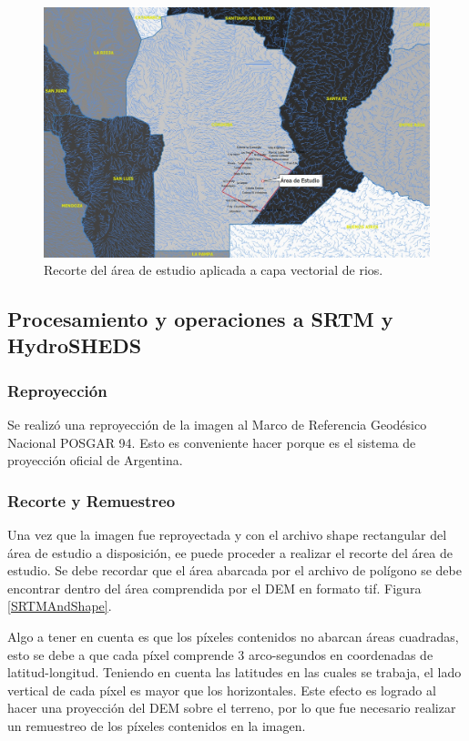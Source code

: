 \documentclass[10pt,a4paper, twoside]{report}
\begin{document}
\begin{figure}[!htb]
   \centering      
   \includegraphics[width=1.0\textwidth]{imagenes/areaestudiorios.jpg}
 \caption{Recorte del área de estudio aplicada a capa vectorial de rios.}
 \label{areaestudiorios}
\end{figure}

\subsection{Procesamiento y operaciones a SRTM y HydroSHEDS}


\subsubsection{Reproyección}

Se realizó una reproyección de la imagen al Marco de Referencia Geodésico Nacional POSGAR 94. Esto es conveniente hacer porque es el sistema de proyección oficial de Argentina.

\subsubsection{Recorte y Remuestreo}

Una vez que la imagen fue reproyectada y con el archivo shape rectangular del área de estudio a disposición, ee puede proceder a realizar el recorte del área de estudio. Se debe recordar que el área abarcada por el archivo de polígono se debe encontrar dentro del área comprendida por el DEM en formato tif. Figura \ref{SRTMAndShape}.

Algo a tener en cuenta es que los píxeles contenidos no abarcan áreas cuadradas, esto se debe a que cada píxel comprende 3 arco-segundos en coordenadas de latitud-longitud. Teniendo en cuenta las latitudes en las cuales se trabaja, el lado vertical de cada píxel es mayor que los horizontales. Este efecto es logrado al hacer una proyección del DEM sobre el terreno, por lo que fue necesario realizar un remuestreo de los píxeles contenidos en la imagen.
\end{document}
